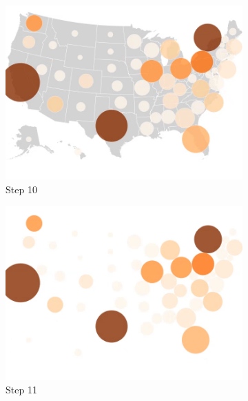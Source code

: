 \begin{figure}
    \begin{subfigure}[b]{0.31\textwidth}
        \centering
        \includegraphics[width=\textwidth]{images/results/dot_cartogram/transition_10.png}
        \caption[]%
        {{\small Step 10}}
    \end{subfigure}
    \hfill
    \begin{subfigure}[b]{0.31\textwidth}
        \centering
        \includegraphics[width=\textwidth]{images/results/dot_cartogram/transition_11.png}
        \caption[]%
        {{\small Step 11}}
    \end{subfigure}
    \hfill
    \begin{subfigure}[b]{0.31\textwidth}
        \centering

\end{subfigure}
\end{figure}
